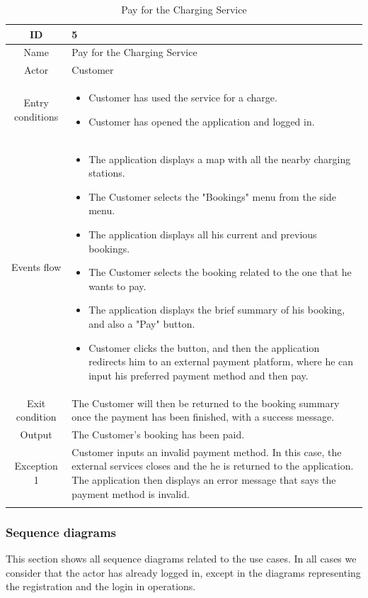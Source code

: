 \begin{longtable}{|c| p{10cm}|}
    \hline ID        & 5\\
    \hline
    Name     & Pay for the Charging Service \\
    \hline
    Actor            & Customer\\
    \hline
    Entry conditions & \begin{itemize}[nosep,after=\strut]
        \item Customer has used the service for a charge.
        \item Customer has opened the application and logged in.
    \end{itemize}
        \\
    \hline
    Events flow      & \begin{itemize}[nosep,after=\strut]
        \item The application displays a map with all the nearby charging stations.
        \item The Customer selects the "Bookings" menu from the side menu.
        \item The application displays all his current and previous bookings.
        \item The Customer selects the booking related to the one that he wants to pay.
        \item The application displays the brief summary of his booking, and also a "Pay" button.
        \item Customer clicks the button, and then the application redirects him to an external payment platform, where he can input his preferred payment method and then pay. 
    \end{itemize}\\
    \hline
    Exit condition   & The Customer will then be returned to the booking summary once the payment has been finished, with a success message.\\
    \hline
    Output           &  The Customer's booking has been paid.
    \\
    \hline
    \hline
    Exception 1      &  Customer inputs an invalid payment method. In this case, the external services closes and the he is returned to the application. The application then displays an error message that says the payment method is invalid. \\
    \hline
    \caption{Pay for the Charging Service}\\
\end{longtable}
\subsubsection{Sequence diagrams}
This section shows all sequence diagrams related to the use cases. In all cases we consider that the actor has already logged in, except in the diagrams representing the registration and the login in operations.


